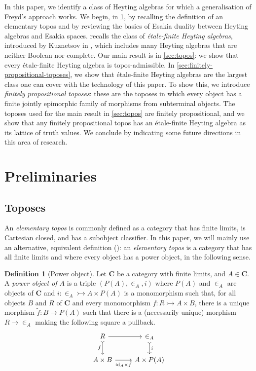 \documentclass[12pt]{amsart}
\theoremstyle{plain}
\theoremstyle{definition}
\newtheorem{definition}[theorem]{Definition}
\newcommand{\cat}[1]{\mathbf{#1}}
\newcommand{\id}{\mathrm{id}}
\begin{document}
In this paper, we identify a class of Heyting algebras for which a generalisation of Freyd's approach works. We begin, in \cref{sec: preliminaries}, by recalling the definition of an elementary topos and by reviewing the basics of Esakia duality between Heyting algebras and Esakia spaces. 
 recalls the class of \emph{étale-finite Heyting algebras}, introduced by Kuznetsov in \cite{kuznetsovetale}, which includes many Heyting algebras that are neither Boolean nor complete.
Our main result is in \cref{sec:topos}: we show that every étale-finite Heyting algebra is topos-admissible. 
In \cref{sec:finitely-propositional-toposes}, we show that étale-finite Heyting algebras are the largest class one can cover with the technology of this paper. To show this, we introduce \emph{finitely propositional toposes}: these are the toposes in which every object has a finite jointly epimorphic family of morphisms from subterminal objects.
The toposes used for the main result in \cref{sec:topos} are finitely propositional, and we show that any finitely propositional topos has an étale-finite Heyting algebra as its lattice of truth values. We conclude by indicating some future directions in this area of research.




\section{Preliminaries} \label{sec: preliminaries}



\subsection{Toposes}


An \emph{elementary topos} is commonly defined as a category that has finite limits, is Cartesian closed, and has a subobject classifier.
In this paper, we will mainly use an alternative, equivalent definition (\cite[Cor.~A.2.3.4]{johnstone2002sketches}): an \emph{elementary topos} is a category that has all finite limits and where every object has a power object, in the following sense.

\begin{definition}[Power object]
    Let $\cat{C}$ be a category with finite limits, and $A\in \cat{C}$. A \emph{power object of $A$} is a triple $(P(A),{\in_{A}},i)$ where $P(A)$ and $\in_{A}$ are objects of $\cat{C}$ and $i \colon {\in_{A}}\rightarrowtail A\times P(A)$ is a monomorphism such that, for all objects $B$ and $R$ of $\cat{C}$ and every monomorphism $f \colon R\rightarrowtail A\times B$, there is a unique morphism $\tilde{f} \colon B\to P(A)$ such that there is a (necessarily unique) morphism $R \to {\in_A}$ making the following square a pullback. 
    \[
        \begin{tikzcd}
            R \arrow[d, tail, "f"'] \arrow[r]                    & \in_{A} \arrow[d, tail, "i"] \\
            A\times B \arrow[r, "\id_{A}\times \tilde{f}"'] & A\times P(A)
        \end{tikzcd}
    \]
\end{definition}
\end{document}
